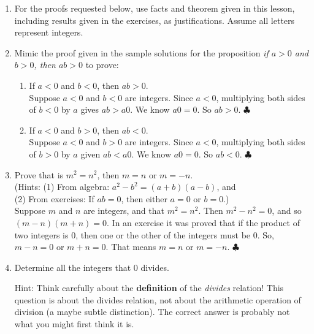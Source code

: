 \documentclass[11pt]{amsart}
\begin{document}
\begin{enumerate}

\item[]
{\small For the proofs requested below, use facts and theorem 
given in this lesson, including results given in the exercises,  as justifications. Assume all letters represent
integers.}\\[5pt]

\item  Mimic the proof given in the sample solutions for the proposition
 {\it if $a>0$ and $b>0$, then $ab>0$} to prove:\\[3pt]
 
\begin{enumerate}
\item If $a<0$ and $b<0$, then $ab>0$.\\[3pt]
{\color{blue} 
Suppose $a<0$ and $b<0$ are integers. Since $a<0$, multiplying both sides of $b<0$ by $a$ gives
$ab>a0$. We know $a0 = 0$. So $ab >0$. $\clubsuit$\\[5pt]
}

\item If $a<0$ and $b>0$, then $ab<0$.\\[3pt]
{\color{blue} 
Suppose $a<0$ and $b>0$ are integers. Since $a<0$, multiplying both sides of $b>0$ by $a$ given
$ab<a0$. We know $a0 = 0$. So $ab <0$. $\clubsuit$\\[5pt]
}

\end{enumerate}


\item 
Prove that is $m^{2} = n^{2}$, then $m=n$ or $m = -n$.\\
 (Hints: (1) From algebra: $a^{2}-b^{2} = (a+b)(a-b)$, and \\
 (2) From exercises: If $ab=0$, then either $a=0$ or $b=0$.) \\[3pt]
 
 {\color{blue}
 Suppose $m$ and $n$ are integers, and that $m^2 = n^2$. Then $m^2 - n^2 = 0$, and so $(m-n)(m+n) = 0$.
 In an exercise it was proved that if the product of two integers is $0$, then one or the other of the integers must be $0$.
 So, $m-n=0$ or $m+n=0$. That means $m=n$ or $m=-n$. $\clubsuit$\\[5pt]
 }

\item  Determine all the integers that $0$ divides.

Hint: Think carefully about the {\bf definition} of the {\it divides} relation! This question is about the divides relation, not about the arithmetic operation of division (a maybe subtle distinction). The correct answer is probably not what you might first think it is.\\[3pt]


\end{enumerate}
\end{document}

